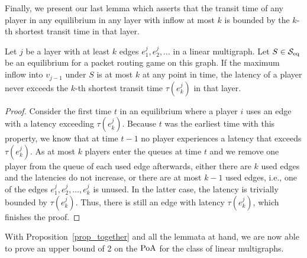 %
%
\noindent Finally, we present our last lemma which asserts that the transit time of any player in any equilibrium in any layer with inflow at most $k$ is bounded by the $k$-th shortest transit time in that layer.
\begin{lemma}\label{lemma_inflowk}
Let $j$ be a layer with at least $k$ edges $e_1^j, e_2^j, \dots$ in a linear multigraph. Let $S \in \mathcal{S}_{\operatorname{eq}}$ be an equilibrium for a packet routing game on this graph. If the maximum inflow into $v_{j-1}$ under $S$ is at most $k$ at any point in time, the latency of a player never exceeds the $k$-th shortest transit time $\tau(e_k^j)$ in that layer.
\end{lemma}
%
\begin{proof}
Consider the first time $t$ in an equilibrium where a player $i$ uses an edge with a latency exceeding $\tau(e_k^j)$. Because $t$ was the earliest time with this property, we know that at time $t-1$ no player experiences a latency that exceeds $\tau(e_k^j)$. As at most $k$ players enter the queues at time $t$ and we remove one player from the queue of each used edge afterwards, either there are $k$ used edges and the latencies do not increase, or there are at most $k-1$ used edges, i.e., one of the edges $e_1^j, e_2^j, \dots, e_k^j$ is unused. In the latter case, the latency is trivially bounded by $\tau(e_k^j)$. Thus, there is still an edge with latency $\tau(e_k^j)$, which finishes the proof.
\end{proof}
\noindent With Proposition~\ref{prop_together} and all the lemmata at hand, we are now able to prove an upper bound of 2 on the $\operatorname*{PoA}$ for the class of linear multigraphs.

